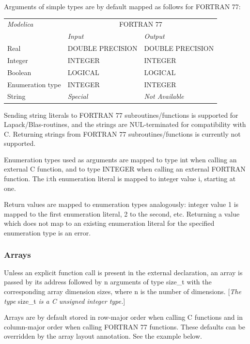 \documentclass[10pt,a4paper]{report}
\def\doublelabel#1{\label{#1}\hypertarget{#1}{}}
\begin{document}
Arguments of simple types are by default mapped as follows for FORTRAN
77:

\begin{longtable}[]{|l|l|l|}
\hline
\emph{Modelica} & \multicolumn{2}{c|}{FORTRAN 77}\\ 
& \emph{Input} & \emph{Output}\\ \hline
\endhead
Real & DOUBLE PRECISION & DOUBLE PRECISION\\ \hline
Integer & INTEGER & INTEGER\\ \hline
Boolean & LOGICAL & LOGICAL\\ \hline
Enumeration type & INTEGER & INTEGER\\ \hline
String & \emph{Special} & \emph{Not Available}\\ \hline
\end{longtable}

Sending string literals to FORTRAN 77 subroutines/functions is supported
for Lapack/Blas-routines, and the strings are NUL-terminated for
compatibility with C. Returning strings from FORTRAN 77
subroutines/functions is currently not supported.

Enumeration types used as arguments are mapped to type int when calling
an external C function, and to type INTEGER when calling an external
FORTRAN function. The i:th enumeration literal is mapped to integer
value i, starting at one.

Return values are mapped to enumeration types analogously: integer value
1 is mapped to the first enumeration literal, 2 to the second, etc.
Returning a value which does not map to an existing enumeration literal
for the specified enumeration type is an error.

\subsubsection{Arrays}\doublelabel{arrays-1}

Unless an explicit function call is present in the external declaration,
an array is passed by its address followed by n arguments of type
size\_t with the corresponding array dimension sizes, where n is the
number of dimensions. {[}\emph{The type} size\_t \emph{is a C unsigned
integer type.}{]}

Arrays are by default stored in row-major order when calling C functions
and in column-major order when calling FORTRAN 77 functions. These
defaults can be overridden by the array layout annotation. See the
example below.
\end{document}
